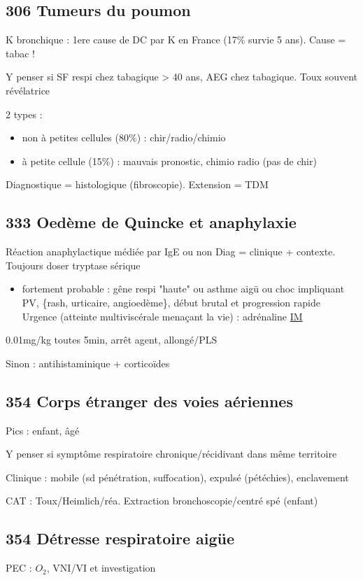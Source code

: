 \documentclass[11pt]{article}
\begin{document}
\subsection{306 Tumeurs du poumon}
\label{sec:orgc09ec78}
K bronchique : 1ere cause de DC par K en France (17\% survie 5 ans). Cause = tabac !

Y penser si SF respi chez tabagique > 40 ans, AEG chez tabagique. Toux souvent révélatrice

2 types :
\begin{itemize}
\item non à petites cellules (80\%) : chir/radio/chimio
\item à petite cellule (15\%) : mauvais pronostic, chimio \textpm{} radio (pas de chir)
\end{itemize}

Diagnostique = histologique (fibroscopie). Extension = TDM
\subsection{333 Oedème de Quincke et anaphylaxie}
\label{sec:org979560c}
Réaction anaphylactique médiée par IgE ou non
Diag = clinique + contexte. Toujours doser tryptase sérique
\begin{itemize}
\item fortement probable : gêne respi "haute" ou asthme aigü ou choc impliquant PV,
 \{rash, urticaire, angioedème\}, début brutal et progression rapide
Urgence (atteinte multiviscérale menaçant la vie) : adrénaline \uline{IM}
\end{itemize}
0.01mg/kg toutes 5min, arrêt agent, allongé/PLS 

Sinon : antihistaminique + corticoïdes

\subsection{354 Corps étranger des voies aériennes}
\label{sec:org82448b3}
Pics : enfant, âgé

Y penser si symptôme respiratoire chronique/récidivant dans même territoire

Clinique : mobile (sd pénétration, suffocation), expulsé (pétéchies), enclavement

CAT : Toux/Heimlich/réa. Extraction bronchoscopie/centré spé (enfant)
\subsection{354 Détresse respiratoire aigüe}
\label{sec:org6724cf6}
PEC : \(O_2\), VNI/VI et investigation
\end{document}
